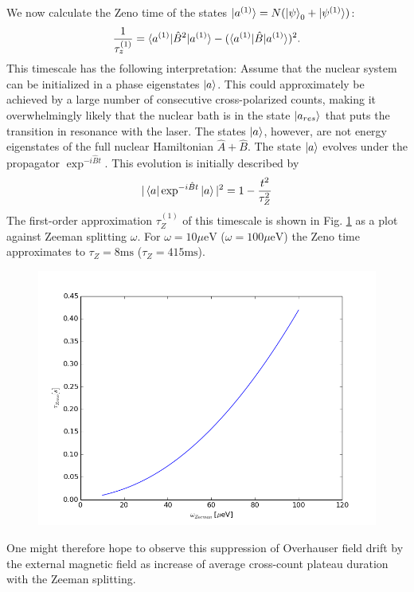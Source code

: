 \documentclass[aps, pra, amsfonts, a4paper, showpacs]{revtex4-1}
\begin{document}
We now calculate the Zeno time of the states $\ket{a^{(1)}}=N(\ket{\psi}_0 + \ket{\psi^{(1)}})$:
\[ \frac{1}{\tau_z^{(1)}} = \braket{a^{(1)} | \hat{B}^2 | a^{(1)}} - (\braket{a^{(1)} | \hat{B} | a^{(1)}})^2. \]
This timescale has the following interpretation:
Assume that the nuclear system can be initialized in a phase eigenstates $\ket{a}$. This could approximately be achieved by a large number of consecutive cross-polarized counts, making it overwhelmingly likely that the nuclear bath is in the state $\ket{a_{res}}$ that puts the transition in resonance with the laser. The states $\ket{a}$, however, are not energy eigenstates of the full nuclear Hamiltonian $\hat{A} + \hat{B}$. The state $\ket{a}$ evolves under the propagator $\exp^{-i \hat{B} t}$. This evolution is initially described by
\[
|\braket{a | \exp^{-i \hat{B} t} | a}|^2 =1- \frac{t^2}{\tau_Z^2} 
\]
The first-order approximation $\tau_Z^{(1)}$ of this timescale is shown in Fig. \ref{fig: tz} as a plot against Zeeman splitting $\omega$. For $\omega=10\mu \mathrm{eV}$ ($\omega=100 \mu \mathrm{eV}$) the Zeno time approximates to $\tau_Z=8 \mathrm{ms}$ ($\tau_Z=415 \mathrm{ms}$).

\begin{figure}
\includegraphics[width=0.6\linewidth]{zeno_redistribution.png}
\label{fig: tz}
\end{figure}

One might therefore hope to observe this suppression of Overhauser field drift by the external magnetic field as increase of average cross-count plateau duration with the Zeeman splitting.


\end{document}
